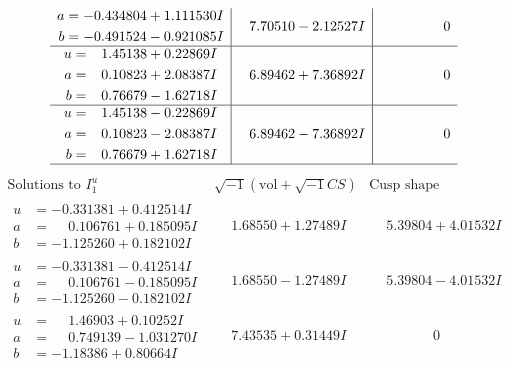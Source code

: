\documentclass[1p]{elsarticle_modified}
\theoremstyle{definition}
\newcommand{\I}{\sqrt{-1}}
\begin{document}
$$\begin{array}{c|c|c}
\begin{aligned}
a &= -0.434804 + 1.111530 I \\
b &= -0.491524 - 0.921085 I\end{aligned}
 & \phantom{-}7.70510 - 2.12527 I & \phantom{-0.000000 } 0 \\ \hline\begin{aligned}
u &= \phantom{-}1.45138 + 0.22869 I \\
a &= \phantom{-}0.10823 + 2.08387 I \\
b &= \phantom{-}0.76679 - 1.62718 I\end{aligned}
 & \phantom{-}6.89462 + 7.36892 I & \phantom{-0.000000 } 0 \\ \hline\begin{aligned}
u &= \phantom{-}1.45138 - 0.22869 I \\
a &= \phantom{-}0.10823 - 2.08387 I \\
b &= \phantom{-}0.76679 + 1.62718 I\end{aligned}
 & \phantom{-}6.89462 - 7.36892 I & \phantom{-0.000000 } 0\\
 \hline 
 \end{array}$$\newpage$$\begin{array}{c|c|c}  
\text{Solutions to }I^u_{1}& \I (\text{vol} + \sqrt{-1}CS) & \text{Cusp shape}\\
 \hline 
\begin{aligned}
u &= -0.331381 + 0.412514 I \\
a &= \phantom{-}0.106761 + 0.185095 I \\
b &= -1.125260 + 0.182102 I\end{aligned}
 & \phantom{-}1.68550 + 1.27489 I & \phantom{-}5.39804 + 4.01532 I \\ \hline\begin{aligned}
u &= -0.331381 - 0.412514 I \\
a &= \phantom{-}0.106761 - 0.185095 I \\
b &= -1.125260 - 0.182102 I\end{aligned}
 & \phantom{-}1.68550 - 1.27489 I & \phantom{-}5.39804 - 4.01532 I \\ \hline\begin{aligned}
u &= \phantom{-}1.46903 + 0.10252 I \\
a &= \phantom{-}0.749139 - 1.031270 I \\
b &= -1.18386 + 0.80664 I\end{aligned}
 & \phantom{-}7.43535 + 0.31449 I & \phantom{-0.000000 } 0 \\ \hline\begin{aligned}

\end{aligned}
\end{array}$$
\end{document}
